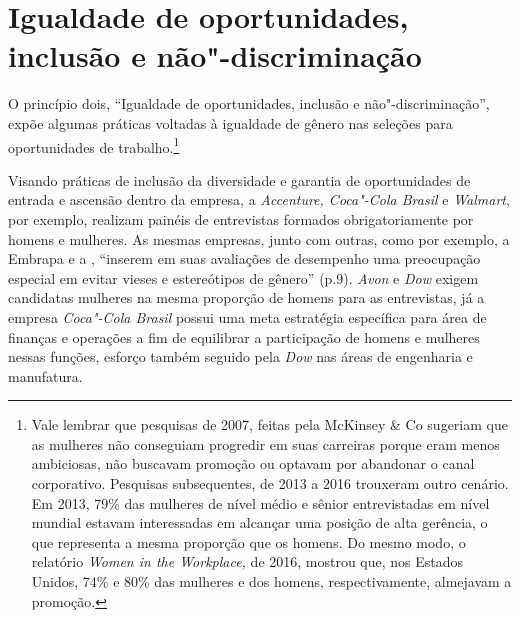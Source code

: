 \section{Igualdade de oportunidades, inclusão e não"-discriminação}

O princípio dois, ``Igualdade de oportunidades, inclusão e
não"-discriminação'', expõe algumas práticas voltadas à igualdade de
gênero nas seleções para oportunidades de trabalho.\footnote{Vale
  lembrar que pesquisas de 2007, feitas pela McKinsey \& Co sugeriam que
  as mulheres não conseguiam progredir em suas carreiras porque eram
  menos ambiciosas, não buscavam promoção ou optavam por abandonar o
  canal corporativo. Pesquisas subsequentes, de 2013 a 2016 trouxeram
  outro cenário. Em 2013, 79\% das mulheres de nível médio e sênior
  entrevistadas em nível mundial estavam interessadas em alcançar uma
  posição de alta gerência, o que representa a mesma proporção que os
  homens. Do mesmo modo, o relatório \emph{Women in the Workplace,} de
  2016, mostrou que, nos Estados Unidos, 74\% e 80\% das mulheres e dos
  homens, respectivamente, almejavam a promoção.}

Visando práticas de inclusão da diversidade e garantia de oportunidades
de entrada e ascensão dentro da empresa, a \emph{Accenture, Coca"-Cola
Brasil} e \emph{Walmart}, por exemplo, realizam painéis de entrevistas
formados obrigatoriamente por homens e mulheres. As mesmas empresas,
junto com outras, como por exemplo, a Embrapa e a , ``inserem em suas
avaliações de desempenho uma preocupação especial em evitar vieses e
estereótipos de gênero'' (p.9). \emph{Avon} e \emph{Dow} exigem
candidatas mulheres na mesma proporção de homens para as entrevistas, já
a empresa \emph{Coca"-Cola Brasil} possui uma meta estratégia específica
para área de finanças e operações a fim de equilibrar a participação de
homens e mulheres nessas funções, esforço também seguido pela \emph{Dow}
nas áreas de engenharia e manufatura.

